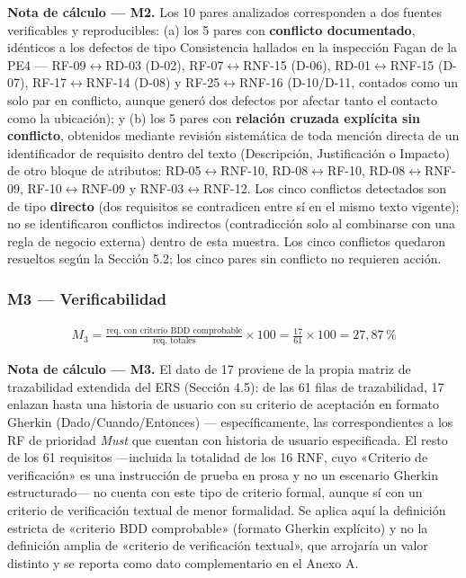 \documentclass[journal,onecolumn]{IEEEtran}
\begin{document}
\textbf{Nota de cálculo --- M2.} Los 10 pares analizados corresponden a dos fuentes verificables y reproducibles: (a) los 5 pares con \textbf{conflicto documentado}, idénticos a los defectos de tipo Consistencia hallados en la inspección Fagan de la PE4 --- RF-09$\leftrightarrow$RD-03 (D-02), RF-07$\leftrightarrow$RNF-15 (D-06), RD-01$\leftrightarrow$RNF-15 (D-07), RF-17$\leftrightarrow$RNF-14 (D-08) y RF-25$\leftrightarrow$RNF-16 (D-10/D-11, contados como un solo par en conflicto, aunque generó dos defectos por afectar tanto el contacto como la ubicación); y (b) los 5 pares con \textbf{relación cruzada explícita sin conflicto}, obtenidos mediante revisión sistemática de toda mención directa de un identificador de requisito dentro del texto (Descripción, Justificación o Impacto) de otro bloque de atributos: RD-05$\leftrightarrow$RNF-10, RD-08$\leftrightarrow$RF-10, RD-08$\leftrightarrow$RNF-09, RF-10$\leftrightarrow$RNF-09 y RNF-03$\leftrightarrow$RNF-12. Los cinco conflictos detectados son de tipo \textbf{directo} (dos requisitos se contradicen entre sí en el mismo texto vigente); no se identificaron conflictos indirectos (contradicción solo al combinarse con una regla de negocio externa) dentro de esta muestra. Los cinco conflictos quedaron resueltos según la Sección 5.2; los cinco pares sin conflicto no requieren acción.

\subsubsection*{M3 --- Verificabilidad}

{\setlength{\jot}{8pt}
	\begin{align*}
		M_3 = \frac{\text{req. con criterio BDD comprobable}}{\text{req. totales}} \times 100 = \frac{17}{61} \times 100 = 27{,}87\,\%
\end{align*}}

\textbf{Nota de cálculo --- M3.} El dato de 17 proviene de la propia matriz de trazabilidad extendida del ERS (Sección 4.5): de las 61 filas de trazabilidad, 17 enlazan hasta una historia de usuario con su criterio de aceptación en formato Gherkin (Dado/Cuando/Entonces) --- específicamente, las correspondientes a los RF de prioridad \emph{Must} que cuentan con historia de usuario especificada. El resto de los 61 requisitos ---incluida la totalidad de los 16 RNF, cuyo «Criterio de verificación» es una instrucción de prueba en prosa y no un escenario Gherkin estructurado--- no cuenta con este tipo de criterio formal, aunque sí con un criterio de verificación textual de menor formalidad. Se aplica aquí la definición estricta de «criterio BDD comprobable» (formato Gherkin explícito) y no la definición amplia de «criterio de verificación textual», que arrojaría un valor distinto y se reporta como dato complementario en el Anexo A.
\end{document}
